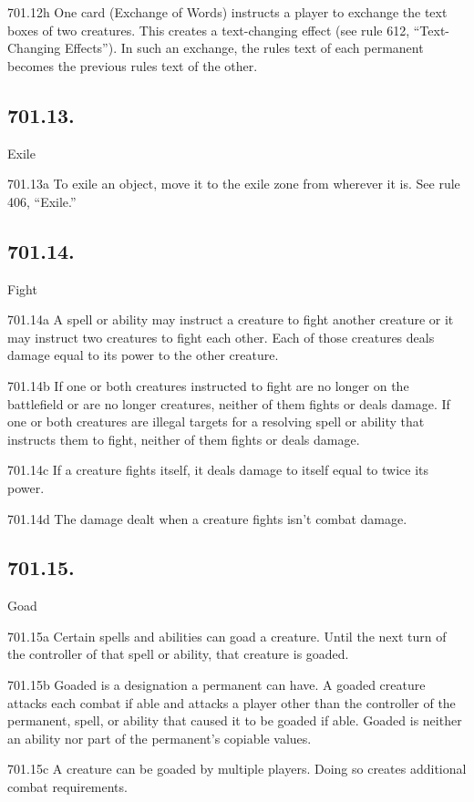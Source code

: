 701.12h One card (Exchange of Words) instructs a player to exchange the text boxes of two creatures. This creates a text-changing effect (see rule 612, “Text-Changing Effects”). In such an exchange, the rules text of each permanent becomes the previous rules text of the other.

\subsection*{701.13.}
Exile

701.13a To exile an object, move it to the exile zone from wherever it is. See rule 406, “Exile.”

\subsection*{701.14.}
Fight

701.14a A spell or ability may instruct a creature to fight another creature or it may instruct two creatures to fight each other. Each of those creatures deals damage equal to its power to the other creature.

701.14b If one or both creatures instructed to fight are no longer on the battlefield or are no longer creatures, neither of them fights or deals damage. If one or both creatures are illegal targets for a resolving spell or ability that instructs them to fight, neither of them fights or deals damage.

701.14c If a creature fights itself, it deals damage to itself equal to twice its power.

701.14d The damage dealt when a creature fights isn’t combat damage.

\subsection*{701.15.}
Goad

701.15a Certain spells and abilities can goad a creature. Until the next turn of the controller of that spell or ability, that creature is goaded.

701.15b Goaded is a designation a permanent can have. A goaded creature attacks each combat if able and attacks a player other than the controller of the permanent, spell, or ability that caused it to be goaded if able. Goaded is neither an ability nor part of the permanent’s copiable values.

701.15c A creature can be goaded by multiple players. Doing so creates additional combat requirements.

